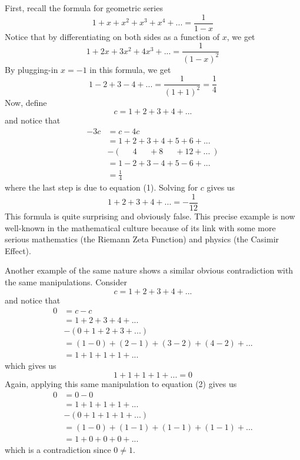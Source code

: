 \documentclass[12pt]{article}
\theoremstyle{definition}
\begin{document}

First, recall the formula for geometric series 
$$1 + x + x^2 + x^3 + x^4 + ... = \frac{1}{1-x}$$
Notice that by differentiating on both sides as a function of $x$, we get
$$1 + 2x + 3x^2 + 4x^3 + ... = \frac{1}{(1-x)^2}$$
By plugging-in $x = -1$ in this formula, we get
\[1 - 2 + 3 - 4 + ... = \frac{1}{(1 + 1)^2} = \frac{1}{4}\tag*{(1)} \]
Now, define
$$c = 1 + 2 + 3 + 4 + ...$$
and notice that
\begin{align*}
    -3c &= c - 4c \\
    &= 1 + 2 + 3 + 4 + 5 + 6 +... \\
    & - ( \quad \; \, 4 \quad \ \ + 8 \quad \ \ + 12 + ... \ ) \\
    &= 1 - 2 + 3 -4 + 5 - 6 + ... \\
    &= \frac{1}{4}
\end{align*}
where the last step is due to equation (1). Solving for $c$ gives us
$$1 + 2 + 3 + 4 + ... = - \frac{1}{12}$$
This formula is quite surprising and obviously false. This precise example is now well-known in the mathematical culture because of its link with some more serious mathematics (the Riemann Zeta Function) and physics (the Casimir Effect). 

Another example of the same nature shows a similar obvious contradiction with the same manipulations. Consider
$$c = 1 + 2 + 3 + 4 + ...$$
and notice that
\begin{align*}
    0 &= c-c \\
    &= 1 + 2 + 3 + 4 + ... \\
    & - (0 + 1 + 2 + 3 + ...) \\
    &= (1 - 0) + (2 - 1) + (3 - 2) + (4 - 2) + ... \\
    &= 1 + 1 + 1 + 1 + ...
\end{align*}
which gives us
\[1 + 1 + 1 + 1 + ... = 0 \tag*{(2)}\]
Again, applying this same manipulation to equation (2) gives us 
\begin{align*}
    0 &= 0-0 \\
    &= 1 + 1 + 1 + 1 + ... \\
    & - (0 + 1 + 1 + 1 + ...) \\
    &= (1 - 0) + (1 - 1) + (1 - 1) + (1 - 1) + ... \\
    &= 1 + 0 + 0 + 0 + ...
\end{align*}
which is a contradiction since $0 \neq 1$. 
\end{document}
